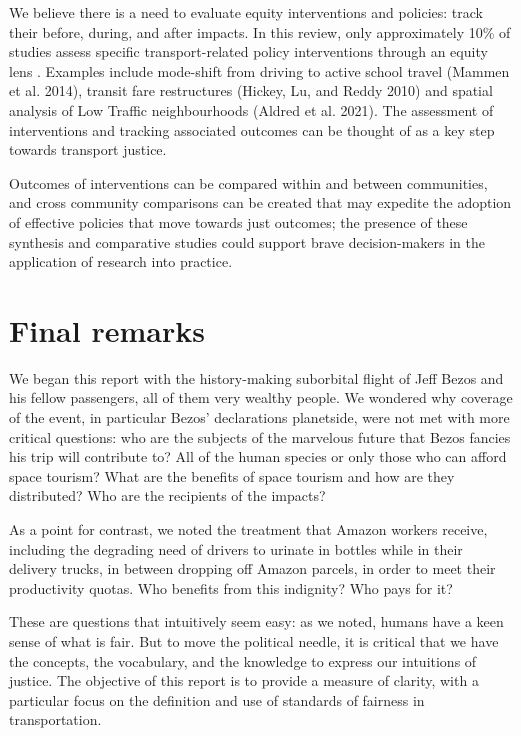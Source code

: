 \documentclass[12pt, oneside]{report}
\begin{document}
We believe there is a need to evaluate equity interventions and
policies: track their before, during, and after impacts. In this review,
only approximately 10\% of studies assess specific transport-related
policy interventions through an equity lens . Examples include
mode-shift from driving to active school travel (Mammen et al. 2014),
transit fare restructures (Hickey, Lu, and Reddy 2010) and spatial
analysis of Low Traffic neighbourhoods (Aldred et al. 2021). The
assessment of interventions and tracking associated outcomes can be
thought of as a key step towards transport justice.

Outcomes of interventions can be compared within and between
communities, and cross community comparisons can be created that may
expedite the adoption of effective policies that move towards just
outcomes; the presence of these synthesis and comparative studies could
support brave decision-makers in the application of research into
practice.

\hypertarget{sect7}{%
\section{Final remarks}\label{sect7}}

We began this report with the history-making suborbital flight of Jeff
Bezos and his fellow passengers, all of them very wealthy people. We
wondered why coverage of the event, in particular Bezos' declarations
planetside, were not met with more critical questions: who are the
subjects of the marvelous future that Bezos fancies his trip will
contribute to? All of the human species or only those who can afford
space tourism? What are the benefits of space tourism and how are they
distributed? Who are the recipients of the impacts?

As a point for contrast, we noted the treatment that Amazon workers
receive, including the degrading need of drivers to urinate in bottles
while in their delivery trucks, in between dropping off Amazon parcels,
in order to meet their productivity quotas. Who benefits from this
indignity? Who pays for it?

These are questions that intuitively seem easy: as we noted, humans have
a keen sense of what is fair. But to move the political needle, it is
critical that we have the concepts, the vocabulary, and the knowledge to
express our intuitions of justice. The objective of this report is to
provide a measure of clarity, with a particular focus on the definition
and use of standards of fairness in transportation.
\end{document}
